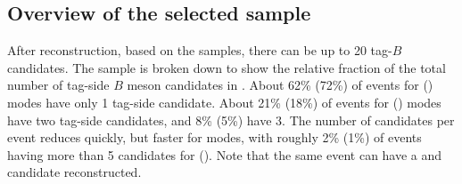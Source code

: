 \subsection{Overview of the selected sample}\label{sec:reconstruction_overview}

After reconstruction, based on the \MC samples, there can be up to 20 tag-$B$ candidates.
The sample is broken down to show the relative fraction of the total number of tag-side $B$ meson candidates in 
.
About 62\% (72\%) of events for \feiBp (\feiBz) modes have only 1 tag-side candidate.
About 21\% (18\%) of events for \feiBp (\feiBz) modes have two tag-side candidates, and 8\% (5\%) have 3.
The number of candidates per event reduces quickly, but faster for \Bz modes, with roughly 2\% (1\%) 
of events having more than 5 candidates for \feiBp (\feiBz).
Note that the same event can have a \Bp and \Bz candidate reconstructed.

